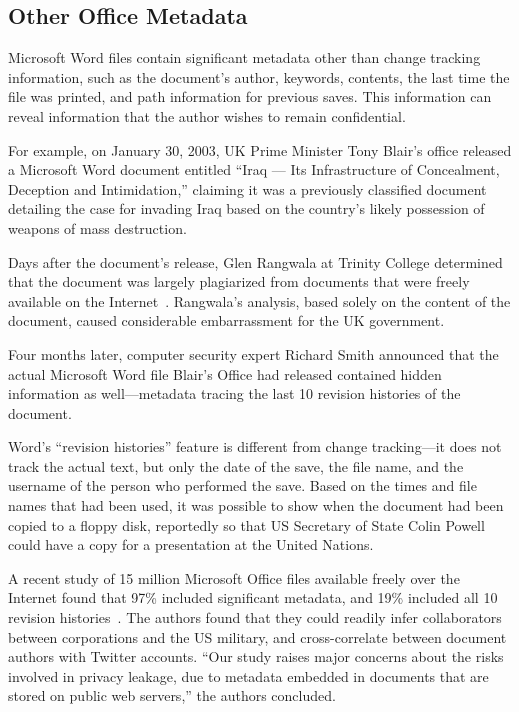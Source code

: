 \subsection{Other Office Metadata}

Microsoft Word files contain significant metadata other than change
tracking information, such as the document's author, keywords,
contents, the last time the file was printed, and path information for
previous saves. This information can reveal information that the
author wishes to remain confidential.

For example, on January 30, 2003, UK Prime Minister Tony Blair's
office released a Microsoft Word document entitled ``Iraq --- Its
Infrastructure of Concealment, Deception and Intimidation,'' claiming
it was a previously classified document detailing the case for
invading Iraq based on the country's likely possession of weapons of
mass destruction.

Days after the document's release, Glen Rangwala at
Trinity College determined that the document was largely
plagiarized from documents that were freely available on the
Internet~\cite{rangwala-2003}.  Rangwala's analysis, based solely on
the content of the document, caused considerable embarrassment for the
UK government.

Four months later, computer security expert Richard Smith
announced that the actual Microsoft Word file Blair's Office had
released contained hidden information as well---metadata tracing the
last 10 revision histories of the document. 

Word's ``revision histories'' feature is different from change
tracking---it does not track the actual text, but only the date of the
save, the file name, and the username of the person who performed the
save. Based on the times and file names that had been used, it was
possible to show when the document had been copied to a floppy disk,
reportedly so that US Secretary of State Colin Powell could have a
copy for a presentation at the United Nations\cite{smith-10}.

A recent study of 15 million Microsoft Office files available freely over the
Internet found that 97\% included significant metadata, and 19\%
included all 10 revision histories~\cite{6503202}. The authors found
that they could readily infer collaborators between corporations and
the US military, and cross-correlate between document authors with
Twitter accounts. ``Our study raises major concerns about the risks
involved in privacy leakage, due to metadata embedded in documents
that are stored on public web servers,'' the authors concluded.


